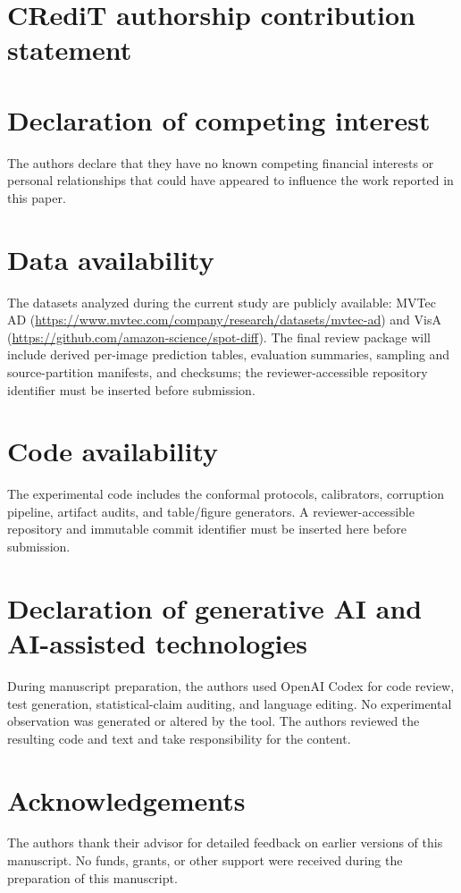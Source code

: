 \section*{CRediT authorship contribution statement}
\printcredits

\section*{Declaration of competing interest}
The authors declare that they have no known competing financial interests or personal relationships that could have appeared to influence the work reported in this paper.

\section*{Data availability}
The datasets analyzed during the current study are publicly available: MVTec AD (\url{https://www.mvtec.com/company/research/datasets/mvtec-ad}) and VisA (\url{https://github.com/amazon-science/spot-diff}). The final review package will include derived per-image prediction tables, evaluation summaries, sampling and source-partition manifests, and checksums; the reviewer-accessible repository identifier must be inserted before submission.

\section*{Code availability}
The experimental code includes the conformal protocols, calibrators, corruption pipeline, artifact audits, and table/figure generators. A reviewer-accessible repository and immutable commit identifier must be inserted here before submission.

\section*{Declaration of generative AI and AI-assisted technologies}
During manuscript preparation, the authors used OpenAI Codex for code review, test generation, statistical-claim auditing, and language editing. No experimental observation was generated or altered by the tool. The authors reviewed the resulting code and text and take responsibility for the content. %

\section*{Acknowledgements}
The authors thank their advisor for detailed feedback on earlier versions of this manuscript. No funds, grants, or other support were received during the preparation of this manuscript.
